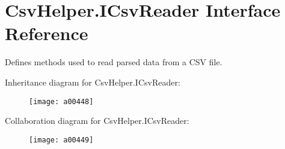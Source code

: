 \hypertarget{a00108}{\section{Csv\-Helper.\-I\-Csv\-Reader Interface Reference}
\label{a00108}
}


Defines methods used to read parsed data from a C\-S\-V file.  




Inheritance diagram for Csv\-Helper.\-I\-Csv\-Reader\-:
\nopagebreak
\begin{figure}[H]
\begin{center}
\leavevmode
\texttt{[image: a00448]}
\end{center}
\end{figure}


Collaboration diagram for Csv\-Helper.\-I\-Csv\-Reader\-:
\nopagebreak
\begin{figure}[H]
\begin{center}
\leavevmode
\texttt{[image: a00449]}
\end{center}
\end{figure}
